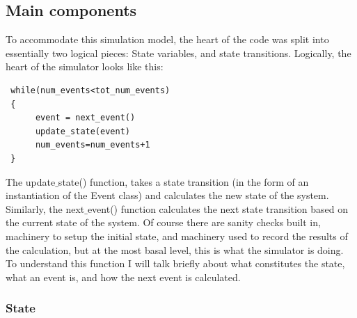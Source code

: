 \documentclass{IEEEtran}%
\begin{document}
 \subsection{Main components}
 To accommodate this simulation model, the heart of the code was split into essentially two logical pieces: State variables, and state transitions.  Logically, the heart of the simulator looks like this:
 \begin{verbatim}
 while(num_events<tot_num_events)
 {
      event = next_event()
      update_state(event)
      num_events=num_events+1
 }
 \end{verbatim}
 The update$\_$state() function, takes a state transition (in the form of an instantiation of the Event class) and calculates the new state of the system.  Similarly, the next$\_$event() function calculates the next state transition based on the current state of the system.  Of course there are sanity checks built in, machinery to setup the initial state, and machinery used to record the results of the calculation, but at the most basal level, this is what the simulator is doing.  To understand this function I will talk briefly about what constitutes the state, what an event is, and how the next event is calculated.
 
 \subsubsection{State}
 
\end{document}
